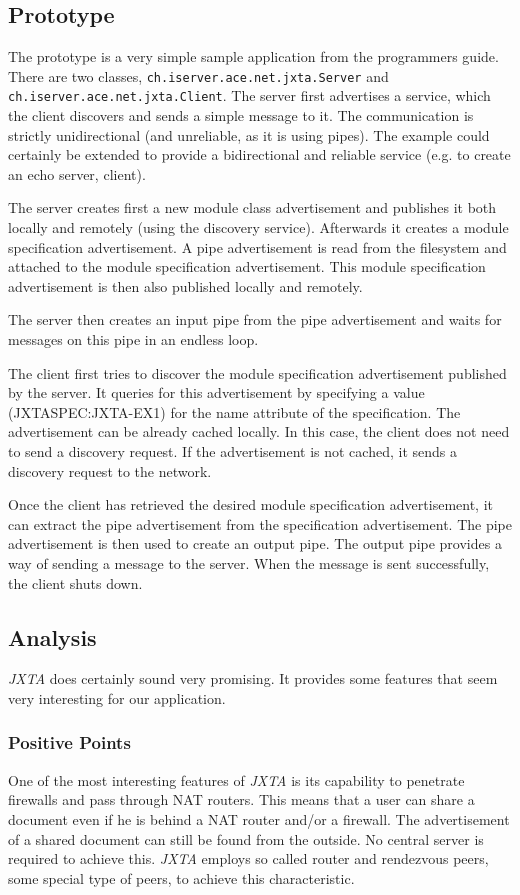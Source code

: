 \subsection{Prototype}
The prototype is a very simple sample application from the programmers guide. There are two classes, \texttt{ch.iserver.ace.net.jxta.Server} and \texttt{ch.iserver.ace.net.jxta.Client}. The server first advertises a service, which the client discovers and sends a simple message to it. The communication is strictly unidirectional (and unreliable, as it is using pipes). The example could certainly be extended to provide a bidirectional and reliable service (e.g. to create an echo server, client).

The server creates first a new module class advertisement and publishes it both locally and remotely (using the discovery service). Afterwards it creates a module specification advertisement. A pipe advertisement is read from the filesystem and attached to the module specification advertisement. This module specification advertisement is then also published locally and remotely.

The server then creates an input pipe from the pipe advertisement and waits for messages on this pipe in an endless loop.

The client first tries to discover the module specification advertisement published by the server. It queries for this advertisement by specifying a value (JXTASPEC:JXTA-EX1) for the name attribute of the specification. The advertisement can be already cached locally. In this case, the client does not need to send a discovery request. If the advertisement is not cached, it sends a discovery request to the network.

Once the client has retrieved the desired module specification advertisement, it can extract the pipe advertisement from the specification advertisement. The pipe advertisement is then used to create an output pipe. The output pipe provides a way of sending a message to the server. When the message is sent successfully, the client shuts down.



\subsection{Analysis}
\emph{JXTA} does certainly sound very promising. It provides some features that seem very interesting for our application.

\subsubsection{Positive Points}
One of the most interesting features of \emph{JXTA} is its capability to penetrate firewalls and pass through NAT routers. This means that a user can share a document even if he is behind a NAT router and/or a firewall. The advertisement of a shared document can still be found from the outside. No central server is required to achieve this. \emph{JXTA} employs so called router and rendezvous peers, some special type of peers, to achieve this characteristic.

